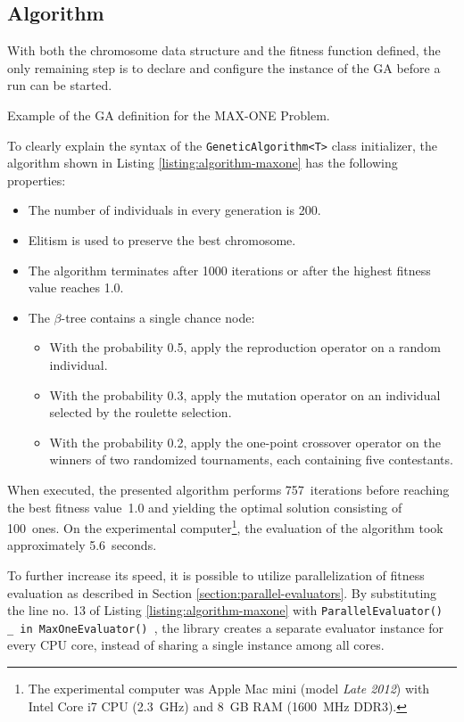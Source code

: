 \subsection{Algorithm}
With both the chromosome data structure and the fitness function defined, the only remaining step is to declare and configure the instance of the GA before a run can be started. 

\begin{listing}[ht]
	\caption{Example of the GA definition for the MAX-ONE Problem.}
	\label{listing:algorithm-maxone}
\end{listing}

To clearly explain the syntax of the \texttt{GeneticAlgorithm<T>} class initializer, the algorithm shown in Listing \ref{listing:algorithm-maxone} has the following properties:
~
\begin{itemize}
	\item The number of individuals in every generation is 200.
	\item Elitism is used to preserve the best chromosome.
	\item The algorithm terminates after 1000 iterations or after the highest fitness value reaches 1.0.
	\item The $\beta$-tree contains a single chance node:
	~
	\begin{itemize}
		\item With the probability 0.5, apply the reproduction operator on a random individual.
		\item With the probability 0.3, apply the mutation operator on an individual selected by the roulette selection.
		\item With the probability 0.2, apply the one-point crossover operator on the winners of two randomized tournaments, each containing five contestants.
	\end{itemize}
\end{itemize}

When executed, the presented algorithm performs 757~iterations before reaching the best fitness value~1.0 and yielding the optimal solution consisting of 100~ones. On the experimental computer\footnote{The experimental computer was Apple Mac mini (model \textit{Late 2012}) with Intel Core i7 CPU (2.3~GHz) and 8~GB RAM (1600~MHz DDR3).}, the evaluation of the algorithm took approximately 5.6~seconds.

To further increase its speed, it is possible to utilize parallelization of fitness evaluation as described in Section \ref{section:parallel-evaluators}. By substituting the line no. 13 of Listing \ref{listing:algorithm-maxone} with \texttt{ParallelEvaluator() { _ in MaxOneEvaluator() }}, the library creates a separate evaluator instance for every CPU core, instead of sharing a single instance among all cores.

